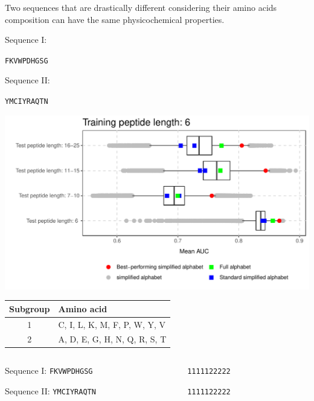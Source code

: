 \documentclass{beamer}\usepackage[]{graphicx}\usepackage[]{color}
\makeatletter
\def\maxwidth{ %
  \ifdim\Gin@nat@width>\linewidth
    \linewidth
  \else
    \Gin@nat@width
  \fi
}
\makeatother
\begin{document}
\begin{frame}  
Two sequences that are drastically different considering their amino acids composition can have the same physicochemical properties.




Sequence I: 

\texttt{FKVWPDHGSG}

\medskip

Sequence II: 

\texttt{YMCIYRAQTN}

\end{frame}  


\begin{frame}

\includegraphics[width=\maxwidth]{figure/unnamed-chunk-9-1} 


\end{frame}  

\begin{frame}
\begin{table}
\begin{tabular}{cl}
\toprule
Subgroup & Amino acid \\ 
\midrule
  1 & C, I, L, K, M, F, P, W, Y, V \\ 
\rowcolor[gray]{0.85}  2 & A, D, E, G, H, N, Q, R, S, T \\ 
\bottomrule
\end{tabular}
\end{table}

\begin{columns}
\begin{column}{0.44\textwidth}
 
Sequence I: \texttt{FKVWPDHGSG} \textrightarrow

Sequence II: \texttt{YMCIYRAQTN} \textrightarrow

\end{column}
\begin{column}{0.5\textwidth}  %

\texttt{1111122222}

\texttt{1111122222}
\end{column}
\end{columns}
\end{frame}  
\end{document}
